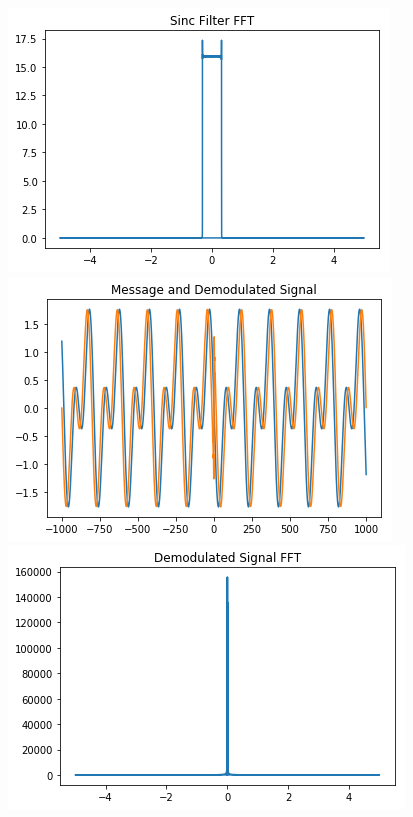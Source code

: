 \documentclass[12pt,a4paper]{article}%
\begin{document}
\begin{flushleft}
\begin{center}
		{\includegraphics[width=0.80 \textwidth]{./images/sinc_fft1.PNG}}
		{\includegraphics[width=0.80 \textwidth]{./images/demod1.PNG}}\\\bigskip
		{\includegraphics[width=0.80 \textwidth]{./images/demod_fft1.PNG}}
   \end{center}
   \end{flushleft}
	\pagebreak
\end{document}
